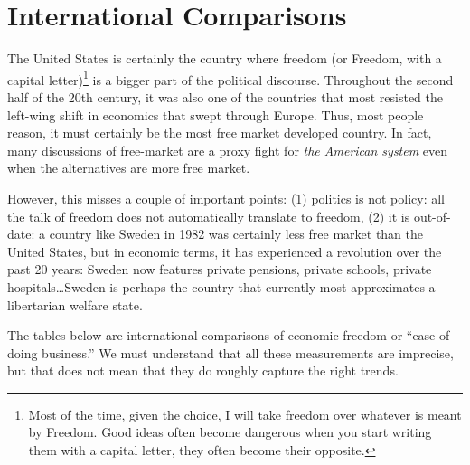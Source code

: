 \chapter{International Comparisons}\label{chpt:international}

The United States is certainly the country where freedom (or Freedom, with a
capital letter)\footnote{Most of the time, given the choice, I will take
freedom over whatever is meant by Freedom. Good ideas often become dangerous
when you start writing them with a capital letter, they often become their
opposite.} is a bigger part of the political discourse. Throughout the second
half of the 20th century, it was also one of the countries that most resisted
the left-wing shift in economics that swept through Europe. Thus, most people
reason, it must certainly be the most free market developed country. In fact,
many discussions of free-market are a proxy fight for \emph{the American
system} even when the alternatives are more free market.

However, this misses a couple of important points: (1) politics is not policy:
all the talk of freedom does not automatically translate to freedom, (2) it is
out-of-date: a country like Sweden in 1982 was certainly less free market than
the United States, but in economic terms, it has experienced a revolution over
the past 20 years: Sweden now features private pensions, private schools,
private hospitals\ldots Sweden is perhaps the country that currently most
approximates a libertarian welfare state.

The tables below are international comparisons of economic freedom or ``ease of
doing business.'' We must understand that all these measurements are imprecise,
but that does not mean that they do roughly capture the right trends.

